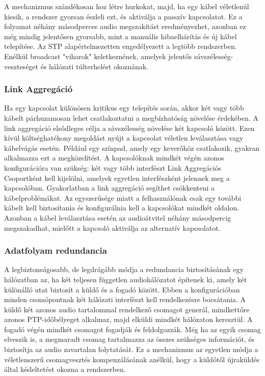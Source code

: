 A mechanizmus szándékosan hoz létre hurkokat, majd, ha egy kábel véletlenül
kiesik, a rendszer gyorsan észleli ezt, és aktiválja a passzív kapcsolatot. 
Ez a folyamat néhány másodperces audio megszakítást eredményezhet, azonban
ez még mindig jelentősen gyorsabb, mint a manuális hibaelhárítás és új kábel
telepítése. Az STP alapértelmezetten engedélyezett a legtöbb rendszerben.
Enélkül broadcast "viharok" keletkeznének, amelyek jelentős sávszélesség-veszteséget
és hálózati túlterhelést okoznának.

\subsubsection{Link Aggregáció}

Ha egy kapcsolat különösen kritikus egy telepítés során, akkor két vagy több kábelt
párhuzamosan lehet csatlakoztatni a megbízhatóság növelése érdekében. 
A link aggregáció elsődleges célja a sávszélesség növelése két kapcsoló között.
Ezen kívül költséghatékony megoldást nyújt a kapcsolat véletlen leválasztása vagy
kábelvágás esetén. Például egy színpad, amely egy keverőhöz csatlakozik, gyakran
alkalmazza ezt a megközelítést. A kapcsolóknak mindkét végén azonos konfigurációra
van szükség: két vagy több interfészt Link Aggregációs Csoportként kell kijelölni,
amelyek egyetlen interfészként jelennek meg a kapcsolóban. Gyakorlatban a link
aggregáció segíthet csökkenteni a kábelproblémákat. Az egyszerűsége miatt a felhasználónak
csak egy további kábelt kell biztosítania és konfigurálnia kell a kapcsolókat mindkét
oldalon. Azonban a kábel leválasztása esetén az audioátvitel néhány másodpercig megszakadhat,
mielőtt a kapcsoló aktiválja az alternatív kapcsolatot.

\subsubsection{Adatfolyam redundancia}

A legbiztonságosabb, de legdrágább módja a redundancia biztosításának egy hálózatban
az, ha két teljesen független audiohálózatot építenek ki, amely két különálló utat
biztosít a küldő és a fogadó között. Ebben a konfigurációban minden csomópontnak
két hálózati interfészt kell rendelkezésre bocsátania. A küldő két azonos audio tartalommal
rendelkező csomagot generál, mindkettőre azonos PTP-időbélyeget alkalmaz, majd elküldi
mindkét hálózaton keresztül. A fogadó végén mindkét csomagot fogadják és feldolgozzák.
Még ha az egyik csomag elveszik is, a megmaradt csomag tartalmazza az összes szükséges
információt, és biztosítja az audio zavartalan folytatását. Ez a mechanizmus az egyetlen
módja a véletlenszerű csomagvesztés kompenzálásának anélkül, hogy a küldőtől újraküldés
által késleltetést okozna a rendszerben.

